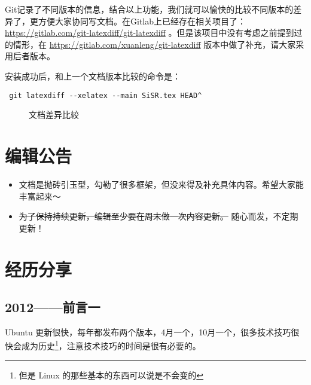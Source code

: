 \documentclass[cn,11pt,chinese,twoside]{elegantbook}
\begin{document}
Git记录了不同版本的信息，结合以上功能，我们就可以愉快的比较不同版本的差异了，更方便大家协同写文档。在Gitlab上已经存在相关项目了：
\url{https://gitlab.com/git-latexdiff/git-latexdiff} 。但是该项目中没有考虑之前提到过的情形，在 
\url{https://gitlab.com/xuanleng/git-latexdiff} 版本中做了补充，请大家采用后者版本。

安装成功后，和上一个文档版本比较的命令是：
\begin{verbatim}
 git latexdiff --xelatex --main SiSR.tex HEAD^
\end{verbatim}


\begin{figure}[h!]
\centering
{}
\caption{文档差异比较}
\label{fig:367}
\end{figure}



\section*{编辑公告}
\begin{itemize}
\item 文档是抛砖引玉型，勾勒了很多框架，但没来得及补充具体内容。希望大家能丰富起来～
\item \sout{为了保持持续更新，编辑至少要在周末做一次内容更新。} 随心而发，不定期更新！
\end{itemize}



\section*{经历分享}
\subsection*{2012——前言一}
    Ubuntu 更新很快，每年都发布两个版本，4月一个，10月一个，很多技术技巧很快会成为历史\footnote{但是 Linux 的那些基本的东西可以说是不会变的}，注意技术技巧的时间是很有必要的。
\end{document}
